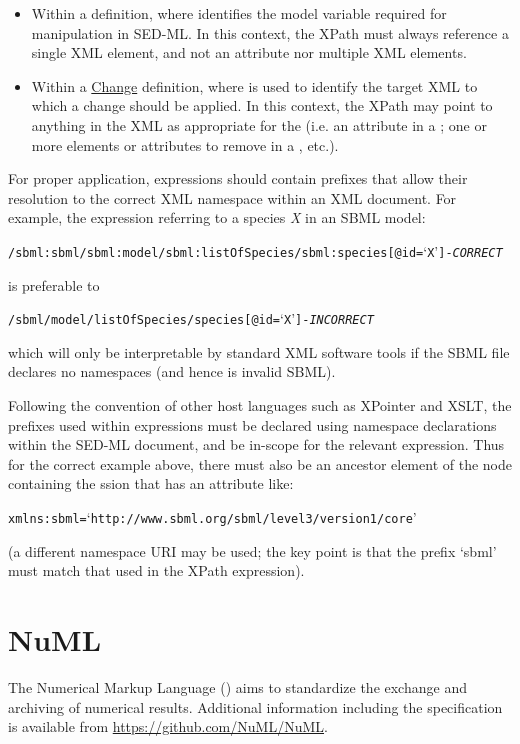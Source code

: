 \begin{itemize}
	\item {Within a \Variable definition, where  identifies the model variable required for manipulation in SED-ML.  In this context, the XPath must always reference a single XML element, and not an attribute nor multiple XML elements.}
	\item {Within a \hyperref[class:change]{Change} definition, where  is used to identify the target XML to which a change should be applied.  In this context, the XPath may point to anything in the XML as appropriate for the \Change (i.e. an attribute in a \ChangeAttribute; one or more elements or attributes to remove in a \RemoveXML, etc.).}
\end{itemize}

For proper application,  expressions should contain prefixes that allow their resolution to the correct XML namespace within an XML document. For example, the  expression referring to a species \emph{X} in an SBML model:
\begin{alltt}
/sbml:sbml/sbml:model/sbml:listOfSpecies/sbml:species[@id=`X'] {\tickYes -\emph{CORRECT}}
\end{alltt}
is preferable to 
\begin{alltt}
/sbml/model/listOfSpecies/species[@id=`X'] {\tickNo -\emph{INCORRECT} }
\end{alltt}

which will only be interpretable by standard XML software tools if the SBML file declares no namespaces (and hence is invalid SBML).

Following the convention of other  host languages such as XPointer and XSLT, the prefixes used within  expressions must be declared using namespace declarations within the SED-ML document, and be in-scope for the relevant expression. Thus for the correct example above, there must also be an ancestor element of the node containing the 
ssion that has an attribute like:
\begin{alltt}
xmlns:sbml=`http://www.sbml.org/sbml/level3/version1/core'
\end{alltt}
(a different namespace URI may be used; the key point is that the prefix `sbml' must match that used in the XPath expression).


\section{NuML}
\label{sec:numl}
The Numerical Markup Language () aims to standardize the exchange and archiving of numerical results. Additional information including the  specification is available from \url{https://github.com/NuML/NuML}.

